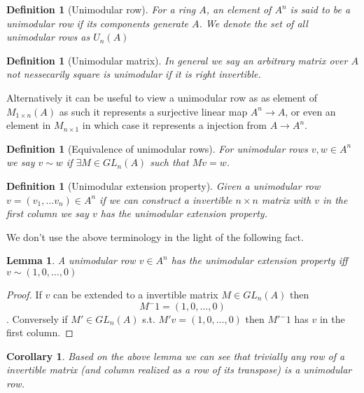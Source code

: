 \documentclass[12pt]{article}
\numberwithin{equation}{section}
\newcounter{dummy} \numberwithin{dummy}{section}
\newtheorem{definition}[dummy]{Definition}
\newtheorem{corollary}[dummy]{Corollary}
\newtheorem{lemma}[dummy]{Lemma}
\begin{document}
	\begin{definition}[Unimodular row]
		For a ring $A$, an element of $A^n$ is said to be a unimodular row if its components generate	$A$. We denote the set of all unimodular rows as $U_n(A)$
	\end{definition}
	\begin{definition}[Unimodular matrix]
		In general we say an arbitrary matrix over $A$ not nessecarily square is unimodular if it is right invertible.
	\end{definition}
	Alternatively it can be useful to view a unimodular row as as element of $M_{1 \times n} (A) $ as such it represents a surjective linear map $A^n \to A$, or even an element in $M_{n \times 1}$ in which case it represents a injection from $A \to A^n$.
	
	\begin{definition}[Equivalence of unimodular rows]
		For unimodular rows $v,w\in A^n$ we say $v \sim w $ if $\exists M \in GL_n(A)$ such that $Mv=w$.
	\end{definition}
	
	\begin{definition}[Unimodular extension property]
		Given a unimodular row $v=(v_1,\dots v_n) \in A^n$ if we can construct a invertible $n \times n $  matrix with $v$ in the first column we say $v$ has the unimodular extension property.
	\end{definition}
	

	
	We don't use the above terminology in the light of the following fact.
	
	\begin{lemma}
		A unimodular row $v \in A^n$ has the unimodular extension property iff $v \sim (1,0,\dots ,0)$
	\end{lemma}
	\begin{proof}
		If $v$ can be extended to a invertible matrix $M \in GL_n(A)$ then \[ M{^-1} = (1,0,\dots, 0) \].
		Conversely if $M' \in GL_n(A) $ s.t. $M'v=(1,0,\dots,0)$ then $M'{^-1}$ has $v$ in the first column.
	\end{proof}
		\begin{corollary}\label{row-of-inv-mat-unimod}
		Based on the above lemma we can see that trivially any row of a invertible matrix (and column realized as a row of its transpose) is a unimodular row. 
	\end{corollary}
	
\end{document}
